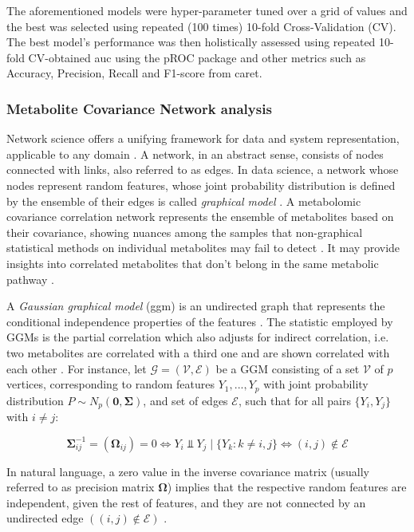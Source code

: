 \documentclass{amsart}
\theoremstyle{plain}
\begin{document}
The aforementioned models were hyper-parameter tuned over a grid of values and the best was selected using repeated (100 times) 10-fold Cross-Validation (CV). The best model's performance was then holistically assessed using repeated 10-fold CV-obtained \acrfull{auc} using the \textsf{pROC} package \cite{pROC} and other metrics such as Accuracy, Precision, Recall and F1-score from \textsf{caret}.

\subsubsection{Metabolite Covariance Network analysis}
Network science offers a unifying framework for data and system representation, applicable to any domain \cite{Barabasi2015NetworkScience}. A network, in an abstract sense, consists of nodes connected with links, also referred to as edges. In data science, a network whose nodes represent random features, whose joint probability distribution is defined by the ensemble of their edges is called \textit{graphical model} \cite{Peeters2022Rags2ridges:Matrices}. A metabolomic covariance correlation network represents the ensemble of metabolites based on their covariance, showing nuances among the samples that non-graphical statistical methods on individual metabolites may fail to detect \cite{PerezDeSouza2020Network-basedInterpretation}. It may provide insights into correlated metabolites that don't belong in the same metabolic pathway \cite{PerezDeSouza2020Network-basedInterpretation}.


A \textit{Gaussian graphical model} (\acrshort{ggm}) is an undirected graph that represents the conditional independence properties of the features \cite{KollerProbabilisticTechniques}. The statistic employed by GGMs is the partial correlation which also adjusts for indirect correlation, i.e. two metabolites are correlated with a third one and are shown correlated with each other \cite{Amara2022NetworksInterpretation}. For instance, let $\mathcal{G=(V,E)}$ be a GGM consisting of a set $\mathcal{V}$ of $p$ vertices, corresponding to random features $Y_1,...,Y_p$ with joint probability distribution $P \sim N_p(\mathbf{0, \Sigma})$, and set of edges $\mathcal{E}$, such that for all pairs $\{Y_i , Y_j\}$ with $i\neq j$:

\[ \mathbf{\Sigma}_{ij}^{-1} = (\mathbf{\Omega}_{ij})=0 \Longleftrightarrow Y_i \Perp Y_j\mid\{Y_k : k \neq i,j\} \Longleftrightarrow (i, j) \notin \mathcal{E} \]

In natural language, a zero value in the inverse covariance matrix (usually referred to as precision matrix $\mathbf{\Omega}$) implies that the respective random features are independent, given the rest of features, and they are not connected by an undirected edge $((i, j) \notin \mathcal{E})$ \cite{Peeters2022Rags2ridges:Matrices}.
\end{document}
